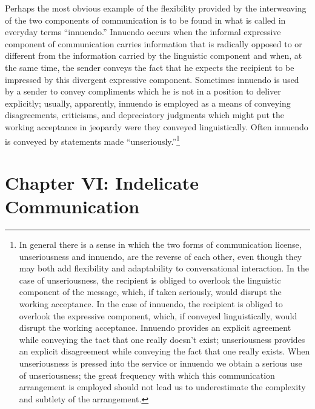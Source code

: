 \documentclass[twoside,symmetric,nobib,justified]{tufte-book}
\let\oldchapter\chapter
\def\chapter{%
  \setcounter{footnote}{0}%
  \oldchapter
}
\begin{document}
Perhaps the most obvious example of the flexibility pro­vided by the
interweaving of the two components of communication is to be found in
what is called in everyday terms ``innuendo.'' Innuendo occurs when the
informal expressive component of communication carries information that
is radically opposed to or different from the information carried by the
linguistic component and when, at the same time, the sender conveys the
fact that he expects the recipient to be impressed by this divergent
expressive component. Sometimes innuendo is used by a sender to convey
compliments which he is not in a position to deliver explicitly;
usually, apparently, innuendo is employed as a means of conveying
disagreements, criticisms, and depreciatory judg­ments which might put
the working acceptance in jeopardy were they conveyed linguistically.
Often innuendo is conveyed by statements made
``unseriously.''\footnote{In general there is a sense in which the two
  forms of communication license, unseriousness and innuendo, are the
  re­verse of each other, even though they may both add flexibility and
  adaptability to conversational interaction. In the case of
  unseriousness, the recipient is obliged to overlook the lin­guistic
  component of the message, which, if taken seriously, would disrupt the
  working acceptance. In the case of innuendo, the recipient is obliged
  to overlook the expressive component, which, if conveyed
  linguistically, would disrupt the working acceptance. Innuendo
  provides an explicit agreement while con­veying the tact that one
  really doesn't exist; unseriousness provides an explicit disagreement
  while conveying the fact that one really exists. When unseriousness is
  pressed into the serv­ice or innuendo we obtain a serious use of
  unseriousness; the great frequency with which this communication
  arrangement is em­ployed should not lead us to underestimate the
  complexity and subtlety of the arrangement.}



\chapter[CHAPTER VI: INDELICATE COMMUNICATION]{Chapter VI: Indelicate Communication}
\label{ch:Chapter VI: Indelicate Communication}

\enlargethispage{\baselineskip}
\end{document}
